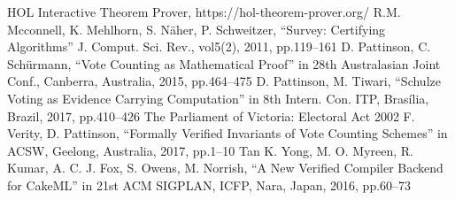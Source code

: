 \documentclass[10pt,conference]{IEEEtran}
\begin{document}
\begin{thebibliography}{00}
HOL Interactive Theorem Prover, https://hol-theorem-prover.org/
R.M. Mcconnell, K. Mehlhorn, S. N\"{a}her, P. Schweitzer, ``Survey: Certifying Algorithms'' J. Comput. Sci. Rev., vol5(2), 2011, pp.119--161
D. Pattinson, C. Sch{\"{u}}rmann, ``Vote Counting as Mathematical Proof'' in 28th Australasian Joint
  Conf., Canberra, Australia, 2015, pp.464--475
D. Pattinson, M. Tiwari, ``Schulze Voting as Evidence Carrying Computation'' in 8th Intern. Con. ITP, Bras{\'i}lia, Brazil, 2017, pp.410--426
The Parliament of Victoria: Electoral Act 2002
F. Verity, D. Pattinson, ``Formally Verified Invariants of Vote Counting Schemes'' in ACSW, Geelong, Australia, 2017, pp.1--10 
Tan K. Yong, M. O. Myreen, R. Kumar, A. C. J. Fox, S. Owens, M. Norrish, ``A New Verified Compiler Backend for CakeML'' in 21st ACM SIGPLAN, ICFP, Nara, Japan, 2016, pp.60--73
\end{thebibliography}
\end{document}
